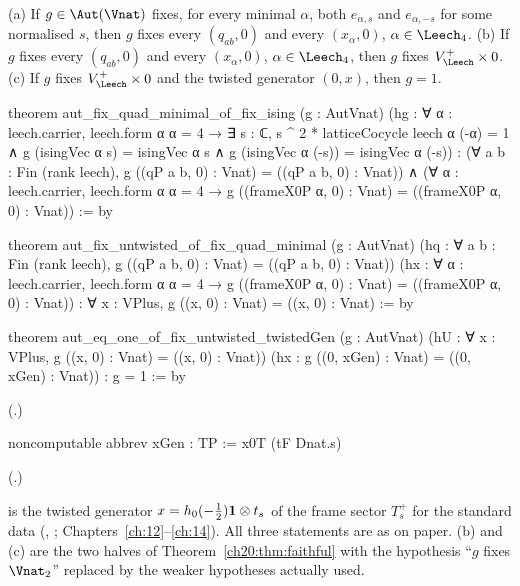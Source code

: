 \begin{lemma}\label{ch20:lem:fixising}
(a) If $g\in\Aut(\Vnat)$ fixes, for every minimal $\alpha$, both $e_{\alpha,s}$ and $e_{\alpha,-s}$ for some normalised $s$, then
$g$ fixes every $(q_{ab},0)$ and every $(x_\alpha,0)$, $\alpha\in\chtwentyLf$.  (b) If $g$ fixes every $(q_{ab},0)$ and every
$(x_\alpha,0)$, $\alpha\in\chtwentyLf$, then $g$ fixes $\chtwentyVL\times0$.  (c) If $g$ fixes $\chtwentyVL\times0$ and the
twisted generator $(0,x)$, then $g=1$.
\end{lemma}
\begin{leancode}
theorem aut_fix_quad_minimal_of_fix_ising (g : AutVnat)
    (hg : ∀ α : leech.carrier, leech.form α α = 4 →
      ∃ s : ℂ, s ^ 2 * latticeCocycle leech α (-α) = 1 ∧
        g (isingVec α s) = isingVec α s ∧ g (isingVec α (-s)) = isingVec α (-s)) :
    (∀ a b : Fin (rank leech), g ((qP a b, 0) : Vnat) = ((qP a b, 0) : Vnat)) ∧
      (∀ α : leech.carrier, leech.form α α = 4 →
        g ((frameX0P α, 0) : Vnat) = ((frameX0P α, 0) : Vnat)) := by

theorem aut_fix_untwisted_of_fix_quad_minimal (g : AutVnat)
    (hq : ∀ a b : Fin (rank leech), g ((qP a b, 0) : Vnat) = ((qP a b, 0) : Vnat))
    (hx : ∀ α : leech.carrier, leech.form α α = 4 →
      g ((frameX0P α, 0) : Vnat) = ((frameX0P α, 0) : Vnat)) :
    ∀ x : VPlus, g ((x, 0) : Vnat) = ((x, 0) : Vnat) := by

theorem aut_eq_one_of_fix_untwisted_twistedGen (g : AutVnat)
    (hU : ∀ x : VPlus, g ((x, 0) : Vnat) = ((x, 0) : Vnat))
    (hx : g ((0, xGen) : Vnat) = ((0, xGen) : Vnat)) : g = 1 := by
\end{leancode}
(.)
\begin{leancode}
noncomputable abbrev xGen : TP := x0T (tF Dnat.s)
\end{leancode}
(.)
\begin{dictionary}
 is the twisted generator $x=h_0(-\tfrac12)\mathbf 1\otimes t_s$ of the frame sector $T^+_s$ for the standard
data (, ; Chapters~\ref{ch:12}--\ref{ch:14}).  All three statements are as on paper.  (b) and (c) are
the two halves of Theorem~\ref{ch20:thm:faithful} with the hypothesis ``$g$ fixes $\Vnat_2$'' replaced by the weaker
hypotheses actually used.
\end{dictionary}
